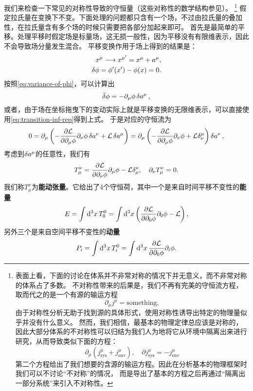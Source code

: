 \documentclass[hyperref, UTF8, a4paper]{ctexart}
\renewcommand{\autoref}{\prettyref}
\begin{document}
我们来检查一下常见的对称性导致的守恒量（这些对称性的数学结构参见\autoref{sec:symmetry}）。%
\footnote{表面上看，下面的讨论在体系并不非常对称的情况下并无意义，而不非常对称的体系占了多数。
不对称性带来的后果是，我们不再有完美的守恒流方程，取而代之的是一个有源的输运方程
\[
    \partial_\mu j^\mu = \text{something},
\]
由于对称性分析无助于找到源的具体形式，使用对称性诱导出特定的物理量似乎并没有什么意义。
然而，我们相信，最基本的物理定律总应该是对称的，因此大部分体系的不对称性可以归结为我们人为地将它从环境中隔离出来进行研究，从而导致类似下面的方程：
\[
    \partial_\mu (j^\mu_\text{sys} + j^\mu_\text{env}), \quad \partial j^\mu_\text{sys} = - j^\mu_\text{env}
\]
第二个方程给出了我们想要的含源的输运方程。因此在分析基本的物理框架时我们可以不讨论“不对称”的情况，
而是导出了基本的方程之后再通过“隔离出一部分系统”来引入不对称性。
}%
假定拉氏量在变换下不变。下面处理的问题都只含有一个场，不过由拉氏量的叠加性，在拉氏量含有多个场的时候只需要把各部分加起来即可。
首先是最简单的平移。处理平移时假定场是标量场，这无损一般性，因为平移没有有限维表示，因此不会导致场分量发生混合。
平移变换作用于场上得到的结果是：
\[
    \begin{split}
        x^\mu \longrightarrow x^{\mu'} = x^\mu + a^\mu, \\
        \var{\phi} = \phi'(x') - \phi(x) = 0.
    \end{split}
\]
按照\eqref{eq:variance-of-phi}，可以计算出
\[
    \bar{\var}{\phi} = - \partial_\mu \phi \var{a^\mu},
\]
或者，由于场在坐标拖曳下的变动实际上就是平移变换的无限维表示，可以直接使用\eqref{eq:transition-inf-rep}得到上式。
于是对应的守恒流为
\[
    0 = \partial_\mu \left( - \pdv{\mathcal{L}}{\partial_\mu \phi} \partial_\nu \phi \var{a^\nu} + \mathcal{L} \var{a^\mu} \right) 
    = \partial_\mu \left( - \pdv{\mathcal{L}}{\partial_\mu \phi} \partial_\nu \phi + \mathcal{L} \delta^\mu_\nu \right) \var{a^\nu},
\]
考虑到$\var{a^\mu}$的任意性，我们有
\begin{equation}
    T_\mu^\nu = \pdv{\mathcal{L}}{\partial_\nu \phi} \partial_\mu \phi - \mathcal{L} \delta^\nu_\mu, \quad \partial_\nu T_\mu^\nu = 0.
\end{equation}
我们称$T^\nu_\mu$为\textbf{能动张量}。它给出了4个守恒荷，其中一个是来自时间平移不变性的\textbf{能量}
\begin{equation}
    E = \int \dd[3]{x} T^0_0 = \int \dd[3]{x} \left( \pdv{\mathcal{L}}{\partial_0 \phi} \partial_0 \phi - \mathcal{L} \right) ,
    \label{eq:field-energy}
\end{equation}
另外三个是来自空间平移不变性的\textbf{动量}
\begin{equation}
    P_i = \int \dd[3]{x} T^0_i = \int \dd[3]{x} \pdv{\mathcal{L}}{\partial_0 \phi} \partial_i \phi .
    \label{eq:field-momentum}
\end{equation}
\end{document}
